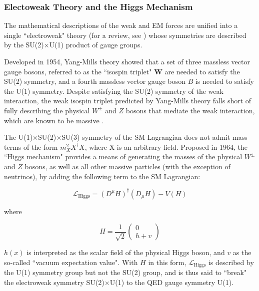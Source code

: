 \subsubsection{Electoweak Theory and the Higgs Mechanism}

The mathematical descriptions of the weak and EM forces are unified into a single ``electroweak" theory (for a review, see \cite{electroweak_2012}) whose symmetries are described by the SU(2)\(\times\)U(1) product of gauge groups. 

Developed in 1954, Yang-Mills theory \cite{yang_mills_1954} showed that a set of three massless vector gauge bosons, referred to as the ``isospin triplet" \(\boldsymbol{W}\) are needed to satisfy the SU(2) symmetry, and a fourth massless vector gauge boson \(B\) is needed to satisfy the U(1) symmetry. Despite satisfying the SU(2) symmetry of the weak interaction, the weak isospin triplet predicted by Yang-Mills theory falls short of fully describing the physical \(W^{\pm}\) and \(Z\) bosons that mediate the weak interaction, which are known to be massive \cite{pdg_2020}.

The U(1)\(\times\)SU(2)\(\times\)SU(3) symmetry of the SM Lagrangian does not admit mass terms of the form \(m_X^2X^\dagger X\), where X is an arbitrary field. Proposed in 1964, the ``Higgs mechanism" \cite{HiggsTheory1,HiggsTheory2,HiggsTheory3} provides a means of generating the masses of the physical \(W^\pm\) and \(Z\) bosons, as well as all other massive particles (with the exception of neutrinos), by adding the following term to the SM Lagrangian:

\begin{equation}
\label{eq:higgs_lagrangian}
\mathcal{L}_\text{Higgs} = (D^\mu H)^\dagger(D_\mu H) - V(H)
\end{equation}

\noindent where

\begin{equation}
H = \frac{1}{\sqrt{2}}
\begin{pmatrix}
0 \\
h+v
\end{pmatrix}
\end{equation}

 \(h(x)\) is interpreted as the scalar field of the physical Higgs boson, and \(v\) as the so-called ``vacuum expectation value". With \(H\) in this form, \(\mathcal{L}_\text{Higgs}\) is described by the U(1) symmetry group but not the SU(2) group, and is thus said to ``break" the electroweak symmetry SU(2)\(\times\)U(1) to the QED gauge symmetry U(1).


